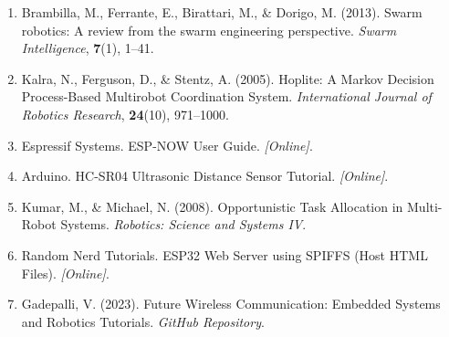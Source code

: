 \documentclass[conference]{IEEEtran}
\begin{document}
\begin{enumerate}
  \item Brambilla, M., Ferrante, E., Birattari, M., \& Dorigo, M. (2013). Swarm robotics: A review from the swarm engineering perspective. \textit{Swarm Intelligence}, \textbf{7}(1), 1–41.

  \item Kalra, N., Ferguson, D., \& Stentz, A. (2005). Hoplite: A Markov Decision Process-Based Multirobot Coordination System. \textit{International Journal of Robotics Research}, \textbf{24}(10), 971–1000.

  \item Espressif Systems. ESP-NOW User Guide. \textit{[Online]}.

  \item Arduino. HC-SR04 Ultrasonic Distance Sensor Tutorial. \textit{[Online]}.

  \item Kumar, M., \& Michael, N. (2008). Opportunistic Task Allocation in Multi-Robot Systems. \textit{Robotics: Science and Systems IV}.

  \item Random Nerd Tutorials. ESP32 Web Server using SPIFFS (Host HTML Files). \textit{[Online]}.

  \item Gadepalli, V. (2023). Future Wireless Communication: Embedded Systems and Robotics Tutorials. \textit{GitHub Repository}.
\end{enumerate}
\end{document}
